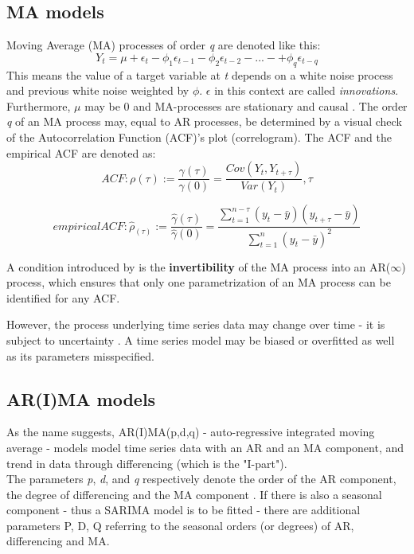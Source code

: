 \documentclass[a4paper, 11pt]{article}
\begin{document}
\subsection{MA models}
Moving Average (MA) processes of order \textit{q} are denoted like this:
\begin{equation}
	Y_{t} = \mu + \epsilon_{t} - \phi_{1}\epsilon_{t-1} - \phi_{2}\epsilon_{t-2} - ... - +\phi_{q}\epsilon_{t-q}
\end{equation}
This means the value of a target variable at \textit{t} depends on a white noise process and previous white noise weighted by $\phi$. $\epsilon$ in this context are called \textit{innovations}. Furthermore, $\mu$ may be 0 and MA-processes are stationary and causal \citep{Vogel.2015}.
The order \textit{q} of an MA process may, equal to AR processes, be determined by a visual check of the Autocorrelation Function (ACF)'s plot (correlogram). The ACF and the empirical ACF are denoted as:
\begin{equation}
ACF:	\rho(\tau) := \frac{\gamma(\tau)}{\gamma(0)} = \frac{Cov(Y_{t},Y_{t+\tau})}{Var(Y_{t})}, \tau \end{equation}

\begin{equation}
empirical ACF: \hat{\rho}_(\tau) := \frac{\hat{\gamma}(\tau)}{\hat{\gamma}(0)} = \frac{\sum_{t = 1}^{n - \tau}(y_{t} - \bar{y})(y_{t + \tau}-\bar{y})}{\sum_{t = 1}^{n}(y_{t}-\bar{y})^2}
\end{equation}

A condition introduced by \cite{Box.1976} is the \textbf{invertibility} of the MA process into an AR($\infty$) process, which ensures that only one parametrization of an MA process can be identified for any ACF.

However, the process underlying time series data may change over time - it is subject to uncertainty \citep{Adhikari.2015}. A time series model may be biased or overfitted as well as its parameters misspecified. \\

\subsection{AR(I)MA models}

As the name suggests, AR(I)MA(p,d,q) - auto-regressive integrated moving average - models model time series data with an AR and an MA component, and trend in data through differencing (which is the "I-part"). \\
The parameters \textit{p}, \textit{d}, and \textit{q} respectively denote the order of the AR component, the degree of differencing and the MA component \citep{Zhao.07022018}.
If there is also a seasonal component - thus a SARIMA model is to be fitted - there are additional parameters P, D, Q referring to the seasonal orders (or degrees) of AR, differencing and MA.\\
\end{document}
